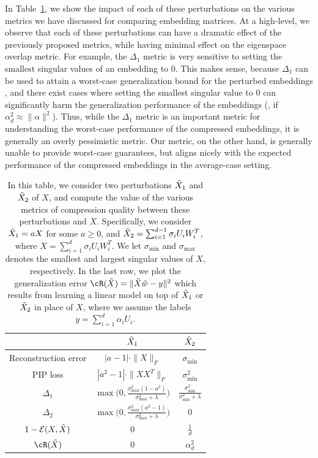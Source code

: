 In Table~\ref{table:perturb}, we show the impact of each of these perturbations on the various metrics we have discussed for comparing embedding matrices.
At a high-level, we observe that each of these perturbations can have a dramatic effect of the previously proposed metrics, while having minimal effect on the eigenspace overlap metric.
For example, the $\Delta_1$ metric is very sensitive to setting the smallest singular values of an embedding to 0.
This makes sense, because $\Delta_1$ can be used to attain a worst-case generalization bound for the perturbed embeddings \citep{lprff18}, and there exist cases where setting the smallest singular value to 0 can significantly harm the generalization performance of the embeddings (\eg, if $\alpha_d^2 \approx \|\alpha\|^2$).
Thus, while the $\Delta_1$ metric is an important metric for understanding the worst-case performance of the compressed embeddings, it is generally an overly pessimistic metric.
Our metric, on the other hand, is generally unable to provide worst-case guarantees, but aligns nicely with the expected performance of the compressed embeddings in the average-case setting.


\begin{table}
	\caption{In this table, we consider two perturbations $\tX_1$ and $\tX_2$ of $X$, and compute the value of the various metrics of compression quality between these perturbations and $X$. Specifically, we consider $\tX_1 = aX$ for some $a \geq 0$, and $\tX_2 = \sum_{i=1}^{d-1} \sigma_i U_i W_i^T$, where $X = \sum_{i=1}^d \sigma_i U_i W_i^T$.  We let $\sigma_{\min}$ and $\sigma_{\max}$ denotes the smallest and largest singular values of $X$, respectively. In the last row, we plot the generalization error $\cR(\tX) = \|\tX \tw - y\|^2$ which results from learning a linear model on top of $\tX_1$ or $\tX_2$ in place of $X$, where we assume the labels $y = \sum_{i=1}^d \alpha_i U_i$.}
	\centering
	\begin{tabular}{ c | c | c }
		& $\tX_1$ & $\tX_2$ \\ \hline
		Reconstruction error & $|a-1| \cdot \|X\|_F$ & $\sigma_{\min}$ \\
		PIP loss & $|a^2 - 1| \cdot \|XX^T\|_F$ & $\sigma_{\min}^2$ \\
		$\Delta_1$ & $\max\Big(0,\frac{\sigma_{\max}^2 (1-a^2) }{\sigma_{\max}^2 + \lambda}\Big)$ & $\frac{\sigma_{\min}^2}{\sigma_{\min}^2 + \lambda}$ \\
		$\Delta_2$ & $\max\Big(0,\frac{\sigma_{\max}^2 (a^2-1) }{\sigma_{\max}^2 + \lambda}\Big)$ & 0 \\
		$1-\eigover(X,\tX)$ & $0$ & $\frac{1}{d}$\\ \hline
		$\cR(\tX)$ & $0$ & $\alpha_d^2$\\
	\end{tabular}
\label{table:perturb}
\end{table}


